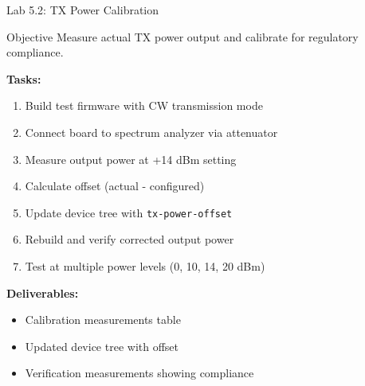 \documentclass{beamer}
\begin{document}
\begin{frame}{Lab 5.2: TX Power Calibration}
\begin{block}{Objective}
Measure actual TX power output and calibrate for regulatory compliance.
\end{block}

\textbf{Tasks:}
\begin{enumerate}
    \item Build test firmware with CW transmission mode
    \item Connect board to spectrum analyzer via attenuator
    \item Measure output power at +14 dBm setting
    \item Calculate offset (actual - configured)
    \item Update device tree with \texttt{tx-power-offset}
    \item Rebuild and verify corrected output power
    \item Test at multiple power levels (0, 10, 14, 20 dBm)
\end{enumerate}

\vspace{0.3cm}

\textbf{Deliverables:}
\begin{itemize}
    \item Calibration measurements table
    \item Updated device tree with offset
    \item Verification measurements showing compliance
\end{itemize}
\end{frame}
\end{document}
